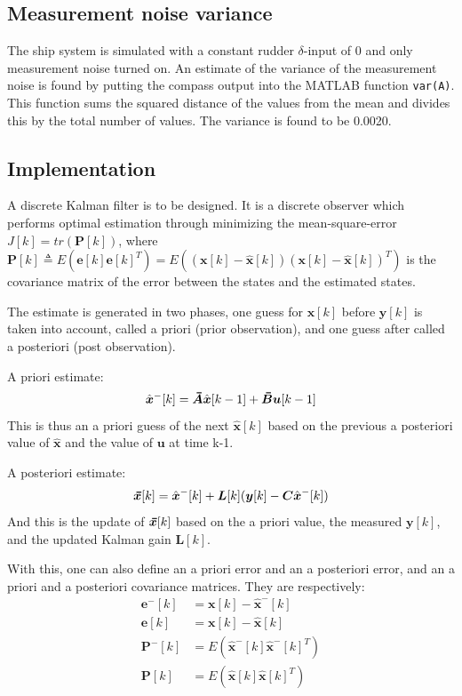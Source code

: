 \subsection{Measurement noise variance}
The ship system is simulated with a constant rudder $\delta$-input of 0 and only measurement noise turned on. An
estimate of the variance of 
the measurement noise is found by putting the compass output into the MATLAB function {\texttt{var(A)}}. This function
sums the squared distance of the values from the mean and divides this by the total number of values. The variance 
is found to be 0.0020.

\subsection{Implementation}
A discrete Kalman filter is to be designed. It is a discrete observer which performs optimal estimation through
minimizing the mean-square-error $J[k] = tr(\bm{P}[k])$, where
$\bm{P}[k] \triangleq E(\bm{e}[k]\bm{e}[k]^T) = E((\bm{x}[k] - \hat{\bm{x}}[k])(\bm{x}[k] - \hat{\bm{x}}[k])^T)$ is the
covariance matrix of the error between the states and the estimated states.

The estimate is generated in two phases, one guess for $\bm{x}[k]$ before $\bm{y}[k]$ is taken into account, called a
priori (prior observation), and one guess after called a posteriori (post observation).

A priori estimate:
\begin{equation}
\hat{\bm{x}}^-[k] = \thickbar{\bm{A}}\hat{\bm{x}}[k-1]+\thickbar{\bm{B}}\bm{u}[k-1] \label{a_priori_x}
\end{equation}
This is thus an a priori guess of the next $\hat{\bm{x}}[k]$ based on the previous a posteriori value of $\hat{\bm{x}}$ and the value of $\bm{u}$ at time k-1.

A posteriori estimate:
\begin{equation}
\thickbar{\bm{x}}[k] = \hat{\bm{x}}^-[k] + \bm{L}[k](\bm{y}[k] - \bm{C}\hat{\bm{x}}^-[k]) \label{a_posteriori_estimate}
\end{equation}
And this is the update of $\thickbar{\bm{x}}[k]$ based on the a priori value, the measured $\bm{y}[k]$, and the updated Kalman gain $\bm{L}[k]$.

With this, one can also define an a priori error and an a posteriori error, and an a priori and a posteriori covariance matrices. They are respectively:
\begin{align}
\bm{e}^-[k] &= \bm{x}[k] - \hat{\bm{x}}^-[k] \\
\bm{e}[k] &= \bm{x}[k] - \hat{\bm{x}}[k] \\
\bm{P}^-[k] &= E(\hat{\bm{x}}^-[k]\hat{\bm{x}}^-[k]^T) \\
\bm{P}[k] &= E(\hat{\bm{x}}[k]\hat{\bm{x}}[k]^T)
\end{align}

